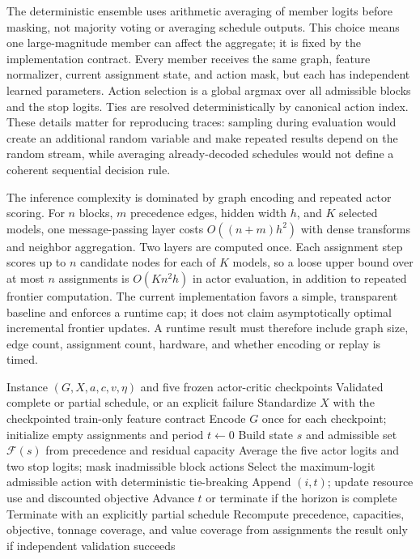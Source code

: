 \documentclass[11pt]{article}
\begin{document}
The deterministic ensemble uses arithmetic averaging of member logits before masking, not majority voting or averaging schedule outputs. This choice means one large-magnitude member can affect the aggregate; it is fixed by the implementation contract. Every member receives the same graph, feature normalizer, current assignment state, and action mask, but each has independent learned parameters. Action selection is a global argmax over all admissible blocks and the stop logits. Ties are resolved deterministically by canonical action index. These details matter for reproducing traces: sampling during evaluation would create an additional random variable and make repeated results depend on the random stream, while averaging already-decoded schedules would not define a coherent sequential decision rule.

The inference complexity is dominated by graph encoding and repeated actor scoring. For $n$ blocks, $m$ precedence edges, hidden width $h$, and $K$ selected models, one message-passing layer costs $O((n+m)h^2)$ with dense transforms and neighbor aggregation. Two layers are computed once. Each assignment step scores up to $n$ candidate nodes for each of $K$ models, so a loose upper bound over at most $n$ assignments is $O(Kn^2h)$ in actor evaluation, in addition to repeated frontier computation. The current implementation favors a simple, transparent baseline and enforces a runtime cap; it does not claim asymptotically optimal incremental frontier updates. A runtime result must therefore include graph size, edge count, assignment count, hardware, and whether encoding or replay is timed.

\begin{algorithm}[ht]
\caption{Deterministic masked ensemble schedule generation with independent final validation.}\label{alg:policy}
\begin{algorithmic}[1]
\Require Instance $(G,X,a,c,v,\eta)$ and five frozen actor-critic checkpoints
\Ensure Validated complete or partial schedule, or an explicit failure
\State Standardize $X$ with the checkpointed train-only feature contract
\State Encode $G$ once for each checkpoint; initialize empty assignments and period $t\gets0$
  \State Build state $s$ and admissible set $\mathcal F(s)$ from precedence and residual capacity
  \State Average the five actor logits and two stop logits; mask inadmissible block actions
  \State Select the maximum-logit admissible action with deterministic tie-breaking
    \State Append $(i,t)$; update resource use and discounted objective
    \State Advance $t$ or terminate if the horizon is complete
  \Else
    \State Terminate with an explicitly partial schedule
  \EndIf
\EndWhile
\State Recompute precedence, capacities, objective, tonnage coverage, and value coverage from assignments
\State \Return the result only if independent validation succeeds
\end{algorithmic}
\end{algorithm}
\end{document}
